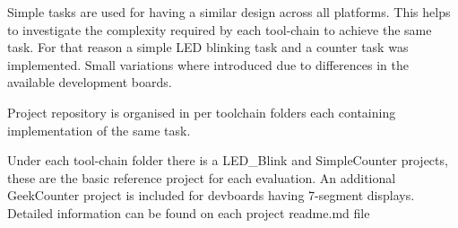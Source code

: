 Simple tasks are used for having a similar design across all platforms. This helps to investigate the complexity required by each tool-chain to achieve the same task. For that reason a simple LED blinking task and a counter task was implemented. Small variations where introduced due to differences in the available development boards.

Project repository\cite{fpga-toolbox-eval-repo} is organised in per toolchain folders each containing implementation of the same task.

Under each tool-chain folder there is a LED\_Blink and SimpleCounter projects, these are the basic reference project for each evaluation. An additional GeekCounter project is included for devboards having 7-segment displays. Detailed information can be found on each project readme.md file